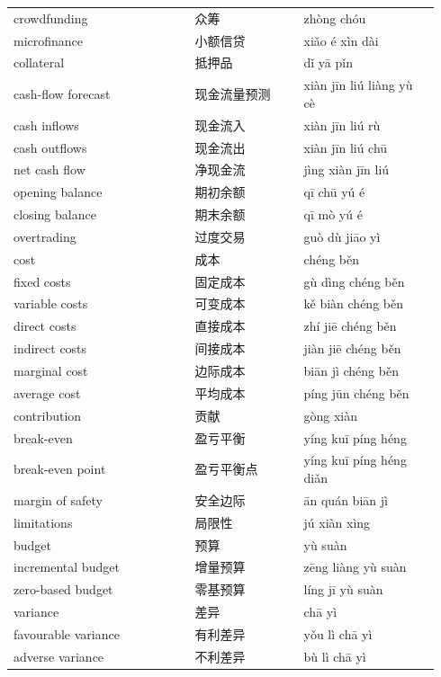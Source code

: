 \documentclass[11pt]{article}
\begin{document}
\begin{longtable}{@{}p{0.40\linewidth}p{0.24\linewidth}p{0.30\linewidth}@{}}
crowdfunding & 众筹 & zhòng chóu \\
microfinance & 小额信贷 & xiǎo é xìn dài \\
collateral & 抵押品 & dǐ yā pǐn \\
cash-flow forecast & 现金流量预测 & xiàn jīn liú liàng yù cè \\
cash inflows & 现金流入 & xiàn jīn liú rù \\
cash outflows & 现金流出 & xiàn jīn liú chū \\
net cash flow & 净现金流 & jìng xiàn jīn liú \\
opening balance & 期初余额 & qī chū yú é \\
closing balance & 期末余额 & qī mò yú é \\
overtrading & 过度交易 & guò dù jiāo yì \\
cost & 成本 & chéng běn \\
fixed costs & 固定成本 & gù dìng chéng běn \\
variable costs & 可变成本 & kě biàn chéng běn \\
direct costs & 直接成本 & zhí jiē chéng běn \\
indirect costs & 间接成本 & jiàn jiē chéng běn \\
marginal cost & 边际成本 & biān jì chéng běn \\
average cost & 平均成本 & píng jūn chéng běn \\
contribution & 贡献 & gòng xiàn \\
break-even & 盈亏平衡 & yíng kuī píng héng \\
break-even point & 盈亏平衡点 & yíng kuī píng héng diǎn \\
margin of safety & 安全边际 & ān quán biān jì \\
limitations & 局限性 & jú xiàn xìng \\
budget & 预算 & yù suàn \\
incremental budget & 增量预算 & zēng liàng yù suàn \\
zero-based budget & 零基预算 & líng jī yù suàn \\
variance & 差异 & chā yì \\
favourable variance & 有利差异 & yǒu lì chā yì \\
adverse variance & 不利差异 & bù lì chā yì \\
\end{longtable}
\end{document}
